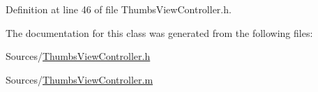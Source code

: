 Definition at line 46 of file Thumbs\-View\-Controller.\-h.



The documentation for this class was generated from the following files\-:\begin{DoxyCompactItemize}
\item 
Sources/\hyperlink{_thumbs_view_controller_8h}{Thumbs\-View\-Controller.\-h}\item 
Sources/\hyperlink{_thumbs_view_controller_8m}{Thumbs\-View\-Controller.\-m}\end{DoxyCompactItemize}

